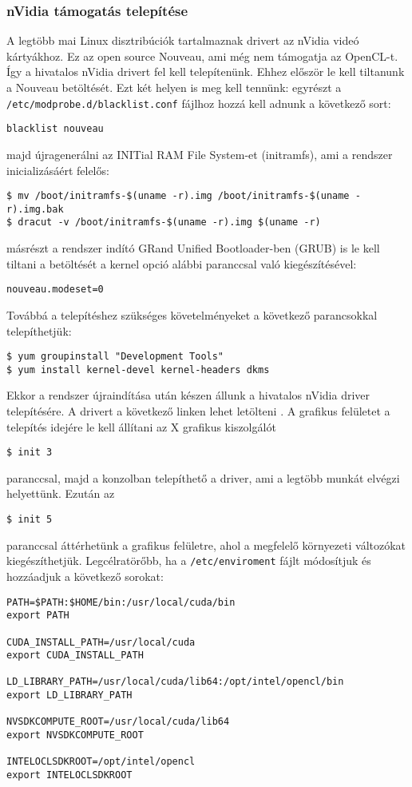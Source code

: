 \subsubsection*{nVidia támogatás telepítése}
	A legtöbb mai Linux disztribúciók tartalmaznak drivert az nVidia videó kártyákhoz.
	Ez az open source Nouveau, ami még nem támogatja az OpenCL-t.
	Így a hivatalos nVidia drivert fel kell telepítenünk.
	Ehhez először le kell tiltanunk a Nouveau betöltését.
	Ezt két helyen is meg kell tennünk: 
	egyrészt a \texttt{/etc/modprobe.d/blacklist.conf} fájlhoz hozzá kell adnunk a
	következő sort:
\begin{lstlisting}
blacklist nouveau
\end{lstlisting}
	majd újragenerálni az INITial RAM File System-et (initramfs), ami a rendszer
	inicializásáért felelős:
\begin{lstlisting}
$ mv /boot/initramfs-$(uname -r).img /boot/initramfs-$(uname -r).img.bak
$ dracut -v /boot/initramfs-$(uname -r).img $(uname -r)
\end{lstlisting}
	másrészt a rendszer indító GRand Unified Bootloader-ben (GRUB) is le kell
	tiltani a betöltését a kernel opció alábbi paranccsal való kiegészítésével:
\begin{lstlisting}
nouveau.modeset=0
\end{lstlisting}
	Továbbá a telepítéshez szükséges követelményeket a következő parancsokkal telepíthetjük:
\begin{lstlisting}
$ yum groupinstall "Development Tools"
$ yum install kernel-devel kernel-headers dkms
\end{lstlisting}
	Ekkor a rendszer újraindítása után készen állunk a hivatalos nVidia driver
	telepítésére. A drivert a következő linken lehet letölteni \cite{nvidia-driver}.
	A grafikus felületet a telepítés idejére le kell állítani az X grafikus
	kiszolgálót
\begin{lstlisting}
$ init 3
\end{lstlisting}
	paranccsal, majd a konzolban telepíthető a driver, ami a legtöbb munkát elvégzi helyettünk. Ezután az
\begin{lstlisting}
$ init 5
\end{lstlisting}
	paranccsal áttérhetünk a grafikus felületre, ahol a megfelelő környezeti változókat kiegészíthetjük.
	Legcélratörőbb, ha a \texttt{/etc/enviroment} fájlt módosítjuk és hozzáadjuk
	a következő sorokat:
\begin{lstlisting}
PATH=$PATH:$HOME/bin:/usr/local/cuda/bin
export PATH

CUDA_INSTALL_PATH=/usr/local/cuda
export CUDA_INSTALL_PATH

LD_LIBRARY_PATH=/usr/local/cuda/lib64:/opt/intel/opencl/bin
export LD_LIBRARY_PATH

NVSDKCOMPUTE_ROOT=/usr/local/cuda/lib64
export NVSDKCOMPUTE_ROOT

INTELOCLSDKROOT=/opt/intel/opencl
export INTELOCLSDKROOT
\end{lstlisting}

